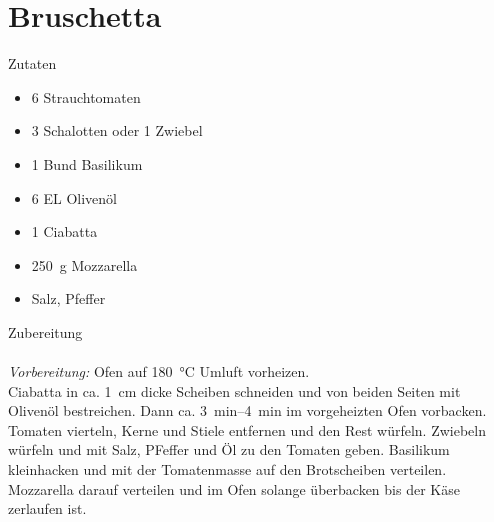 \section*{Bruschetta}
\ihead{}\ohead{}
\cfoot{}
{\Large Zutaten}
\begin{multicols}{2}
\begin{itemize}
    \item \num{6} Strauchtomaten
    \item \num{3} Schalotten oder \num{1} Zwiebel
    \item \num{1} Bund Basilikum
    \item \num{6} EL Olivenöl
    \item \num{1} Ciabatta
    \item \SI{250}{g} Mozzarella
    \item Salz, Pfeffer
\end{itemize}
\end{multicols}
\noindent
{\Large Zubereitung}\\
\\
\textit{Vorbereitung:} Ofen auf \SI{180}{\celsius} Umluft vorheizen.\\
Ciabatta in ca. \SI{1}{cm} dicke Scheiben schneiden und von beiden Seiten mit Olivenöl bestreichen. 
Dann ca. \SIrange{3}{4}{min} im vorgeheizten Ofen vorbacken.
Tomaten vierteln, Kerne und Stiele entfernen und den Rest würfeln. 
Zwiebeln würfeln und mit Salz, PFeffer und Öl zu den Tomaten geben.
Basilikum kleinhacken und mit der Tomatenmasse auf den Brotscheiben verteilen.
Mozzarella darauf verteilen und im Ofen solange überbacken bis der Käse zerlaufen ist. 